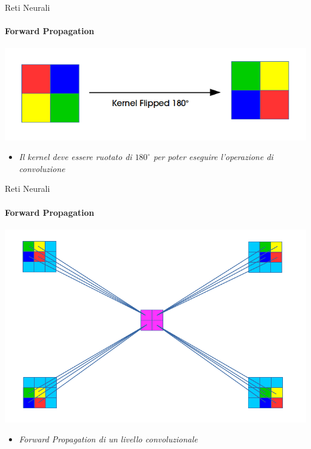\documentclass[
 ]{beamer}
\begin{document}
\begin{frame}{Reti Neurali}
    \framesubtitle{Forward Propagation} 
    
    \bigskip
    
    \begin{center}
      \includegraphics[scale = 0.4]{forward_flipped.png}
    \end{center}
  
    \bigskip \smallskip
        
    \begin{itemize}
        \setlength\itemsep{1em}
        \item[] \large \emph{Il kernel deve essere ruotato di $180^\circ$ per poter eseguire l'operazione di convoluzione}
    \end{itemize}
\end{frame}

\begin{frame}{Reti Neurali}
    \framesubtitle{Forward Propagation} 
    
    \begin{center}
      \includegraphics[scale = 0.35]{forward_conv2.png}
    \end{center}
        
    \begin{itemize}
        \setlength\itemsep{1em}
        \item[] \large \emph{Forward Propagation di un livello convoluzionale}
    \end{itemize}
\end{frame}
\end{document}
